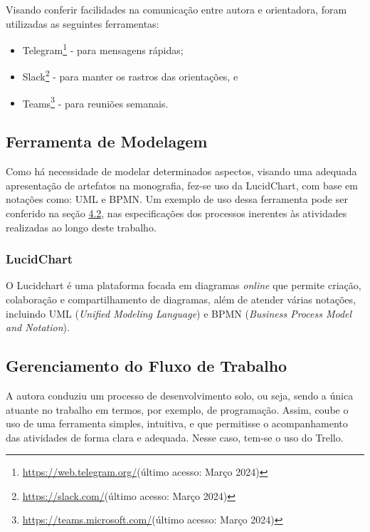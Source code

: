 \begin{description}
    \item Visando conferir facilidades na comunicação entre autora e orientadora, foram utilizadas as seguintes ferramentas:
          \begin{itemize}
              \item Telegram\footnote{\url{https://web.telegram.org/}(último acesso: Março 2024)} - para mensagens rápidas;

              \item Slack\footnote{\url{https://slack.com/}(último acesso: Março 2024)} - para manter os rastros das orientações, e

              \item Teams\footnote{\url{https://teams.microsoft.com/}(último acesso: Março 2024)} - para reuniões semanais.
          \end{itemize}
\end{description}

\subsection{Ferramenta de Modelagem}
\label{sec:Ferramenta de Modelagem}
Como há necessidade de modelar determinados aspectos, visando uma adequada apresentação de artefatos na monografia, fez-se uso da LucidChart, com base em notações como: UML e BPMN. Um exemplo de 
uso dessa ferramenta pode ser conferido na seção \hyperref[sec:Fluxo de Atividades]{4.2}, nas especificações dos processos inerentes às atividades realizadas ao longo deste trabalho.

\subsubsection{LucidChart}
\label{sec:LucidChart}
O Lucidchart \cite{lucidchart} é uma plataforma focada em diagramas \textit{online} que permite criação, colaboração e compartilhamento de diagramas, além de atender várias notações, incluindo UML (\textit{Unified Modeling Language}) 
e BPMN (\textit{Business Process Model and Notation}).

\subsection{Gerenciamento do Fluxo de Trabalho}
\label{sec:Gerenciamento do Fluxo de Trabalho}
A autora conduziu um processo de desenvolvimento solo, ou seja, sendo a única atuante no trabalho em termos, por exemplo, de programação. Assim, coube o uso de uma ferramenta simples, intuitiva, e que 
permitisse o acompanhamento das atividades de forma clara e adequada. Nesse caso, tem-se o uso do Trello.

